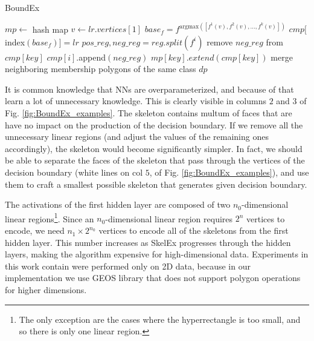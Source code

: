 \documentclass{article}
\begin{document}
\begin{algorithm}
    \caption{BoundEx}\label{alg:boundex}
    \begin{algorithmic}
        \State $mp \gets$ hash map  
            \State $v \gets lr.vertices[1]$
            \State $base_f = f^{\text{argmax}([f^1(v), f^2(v), ..., f^k(v)])}$
            \State $cmp[$index$(base_f)] = lr$  
                        \State $pos\_reg, neg\_reg = reg.split(f^i)$ 
                        \State remove $neg\_reg$ from $cmp[key]$
                        \State $cmp[i]$.append$(neg\_reg)$
                    \EndFor
                \EndFor
            \EndFor
                \State $mp[key].extend(cmp[key])$
            \EndFor
        \EndFor
        \State merge neighboring membership polygons of the same class
        \State \Return $dp$
    \end{algorithmic}
\end{algorithm}

It is common knowledge that NNs are overparameterized, and because of that learn a lot of unnecessary knowledge. This is clearly visible in columns $2$ and $3$ of Fig. \ref{fig:BoundEx_examples}. The skeleton contains multum of faces that are have no impact on the production of the decision boundary. If we remove all the unnecessary linear regions (and adjust the values of the remaining ones accordingly), the skeleton would become significantly simpler. In fact, we should be able to separate the faces of the skeleton that pass through the vertices of the decision boundary (white lines on col $5$, of Fig. \ref{fig:BoundEx_examples}), and use them to craft a smallest possible skeleton that generates given decision boundary.

The activations of the first hidden layer are composed of two $n_0$-dimensional linear regions\footnote{The only exception are the cases where the hyperrectangle is too small, and so there is only one linear region.}. Since an $n_0$-dimensional linear region requires $2^n$ vertices to encode, we need $n_1\times2^{n_0}$ vertices to encode all of the skeletons from the first hidden layer. This number increases as SkelEx progresses through the hidden layers, making the algorithm expensive for high-dimensional data. Experiments in this work contain were performed only on 2D data, because in our implementation we use GEOS library \cite{GEOS} that does not support polygon operations for higher dimensions. 
\end{document}
